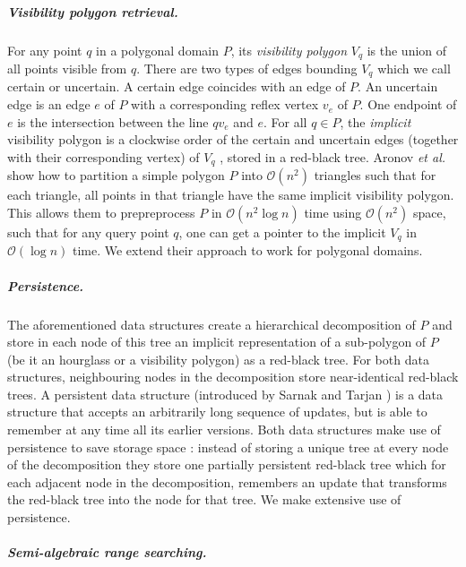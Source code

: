 \documentclass[a4paper, UKenglish]{lipics-v2018}
\newcommand{\etal}{\textit{et al.}\xspace}
\begin{document}
\subparagraph{Visibility polygon retrieval.}
For any point $q$ in a polygonal domain $P$, its \emph{visibility polygon} $V_q$ is the union of all points visible from $q$. There are two types of edges bounding $V_q$ which we call certain or uncertain. A certain edge coincides with an edge of $P$. An uncertain edge is an edge $e$ of $P$ with a corresponding reflex vertex $v_e$ of $P$. One endpoint of $e$ is the intersection between the line $qv_e$ and $e$. For all $q \in P$, the \emph{implicit} visibility polygon is a clockwise order of the certain and uncertain edges (together with their corresponding vertex) of $V_q$ , stored in a red-black tree. Aronov \etal \cite{aronov2002visibility} show how to partition a simple polygon $P$ into $\mathcal{O}(n^2)$ triangles such that for each triangle, all points in that triangle have the same implicit visibility polygon. This allows them to prepreprocess $P$ in $\mathcal{O}(n^2\log n)$ time using $\mathcal{O}(n^2)$ space, such that for any query point $q$, one can get a pointer to the implicit $V_q$ in $\mathcal{O}(\log n)$ time. We extend their approach to work for polygonal domains.





\subparagraph{Persistence.}
The aforementioned data structures create a hierarchical decomposition of $P$ and store in each node of this tree an implicit representation of a sub-polygon of $P$ (be it an hourglass or a visibility polygon) as a red-black tree. For both data structures, neighbouring nodes in the decomposition store near-identical red-black trees. A persistent data structure (introduced by Sarnak and Tarjan \cite{sarnak1986planar}) is a data structure that accepts an arbitrarily long sequence of updates, but is able to remember at any time all its earlier versions. Both data structures make use of persistence to save storage space \cite{hershberger1991new, aronov2002visibility}: instead of storing a unique tree at every node of the decomposition they store one partially persistent red-black tree  which for each adjacent node in the decomposition, remembers an update that transforms the red-black tree into the node for that tree. We make extensive use of persistence.

\subparagraph{Semi-algebraic range searching.}
\end{document}
